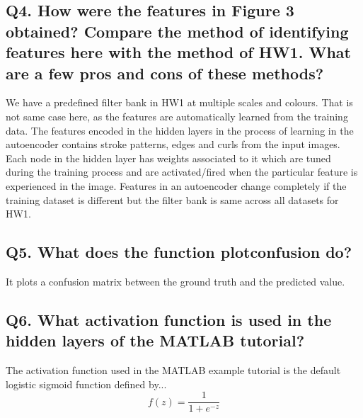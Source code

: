 \documentclass[a4paper,11pt]{article}
\begin{document}
\subsection*{Q4. How were the features in Figure 3 obtained? Compare the method of identifying features here with the method of HW1. What are a few pros and cons of these methods?}
We have a predefined filter bank in HW1 at multiple scales and colours. That is not same case here, as the features are automatically learned from the training data. The features encoded in the hidden layers in the process of learning in the autoencoder contains stroke patterns, edges and curls from the input images. Each node in the hidden layer has weights associated to it which are tuned during the training process and are activated/fired when the particular feature is experienced in the image. Features in an autoencoder change completely if the training dataset is different but the filter bank is same across all datasets for HW1.

\subsection*{Q5. What does the function plotconfusion do?}
It plots a confusion matrix between the ground truth and the predicted value.

\subsection*{Q6. What activation function is used in the hidden layers of the MATLAB tutorial?}
The activation function used in the MATLAB example tutorial is the default logistic sigmoid function defined by...
\begin{equation}
f (z) = \frac{1}{1+e^{-z}}
\end{equation}
\end{document}
